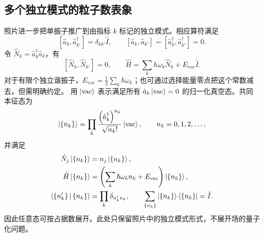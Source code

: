 \subsection{多个独立模式的粒子数表象}
照片进一步把单振子推广到由指标 $k$ 标记的独立模式。相应算符满足
\begin{equation}
\left[\hat a_k,\hat a_{k'}^\dagger\right]=\delta_{kk'}\hat I,\qquad
\left[\hat a_k,\hat a_{k'}\right]=\left[\hat a_k^\dagger,\hat a_{k'}^\dagger\right]=0.
\end{equation}
令 $\hat N_k=\hat a_k^\dagger\hat a_k$，有
\begin{equation}
\left[\hat N_k,\hat N_{k'}\right]=0,\qquad
\hat H=\sum_k\hbar\omega_k\hat N_k+E_{\mathrm{vac}}\hat I.
\end{equation}
对于有限个独立谐振子，$E_{\mathrm{vac}}=\frac12\sum_k\hbar\omega_k$；也可通过选择能量零点把这个常数减去，但需明确约定。
用 $\Ket{\mathrm{vac}}$ 表示满足所有 $\hat a_k\Ket{\mathrm{vac}}=0$ 的归一化真空态。共同本征态为
\begin{equation}
\Ket{\left\{n_k\right\}}=\prod_k\frac{\left(\hat a_k^\dagger\right)^{n_k}}{\sqrt{n_k!}}\Ket{\mathrm{vac}},
\qquad n_k=0,1,2,\ldots,
\end{equation}
并满足
\begin{align}
\hat N_j\Ket{\left\{n_k\right\}}&=n_j\Ket{\left\{n_k\right\}},\\
\hat H\Ket{\left\{n_k\right\}}&=\left(\sum_k\hbar\omega_kn_k+E_{\mathrm{vac}}\right)\Ket{\left\{n_k\right\}},\\
\Braket{\left\{n_k'\right\}|\left\{n_k\right\}}&=\prod_k\delta_{n_k'n_k},\qquad
\sum_{\left\{n_k\right\}}\Ket{\left\{n_k\right\}}\Bra{\left\{n_k\right\}}=\hat I.
\end{align}
因此任意态可按占据数展开。此处只保留照片中的独立模式形式，不展开场的量子化问题。

